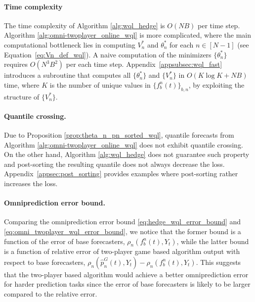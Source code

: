 \paragraph{Time complexity}
The time complexity of Algorithm \ref{alg:wql_hedge} is $O(NB)$ per time step. Algorithm \ref{alg:omni-twoplayer_online_wql} is more complicated, where the main computational bottleneck lies in computing $V_n^*$ and $\theta_n^*$ for each $n \in [N-1]$ (see Equation~\ref{eq:Vn_def_wql}). A naive computation of the minimizers $\{\theta_n^*\}$ requires $O(N^3 B^2)$ per each time step. Appendix~\ref{appsubsec:wql_fast} introduces a subroutine that computes all $\{\theta_n^*\}$ and $\{V_n^*\}$ in $O(K\log K + NB)$ time, where $K$ is the number of unique values in $\{f_b^n(t)\}_{b,n}$, by exploiting the structure of $\{V_n^*\}$.

\paragraph{Quantile crossing.}
Due to Proposition \ref{prop:theta_n_pn_sorted_wql}, quantile forecasts from Algorithm \ref{alg:omni-twoplayer_online_wql} does not exhibit quantile crossing. On the other hand, Algorithm \ref{alg:wql_hedge} does not guarantee such property and post-sorting the resulting quantile does not always decrease the loss. Appendix~\ref{appsec:post_sorting} provides examples where post-sorting rather increases the loss.

\paragraph{Omniprediction error bound.}
Comparing the omniprediction error bound \eqref{eq:hedge_wql_error_bound} and \eqref{eq:omni_twoplayer_wql_error_bound}, we notice that the former bound is a function of the error of base forecasters, $\rho_n(f_b^n(t), Y_t)$, while the latter bound is a function of relative error of two-player game based algorithm output with respect to base forecasters, $\rho_n(\hat{p}^G_n(t), Y_t) - \rho_n(f_b^n(t), Y_t)$. This suggests that the two-player based algorithm would achieve a better omniprediction error for harder prediction tasks since the error of base forecasters is likely to be larger compared to the relative error.